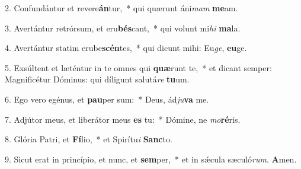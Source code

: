 2. Confundántur et revere\textbf{án}tur,~*  qui quærunt áni\textit{mam} \textbf{me}am.\

3. Avertántur retrórsum, et eru\textbf{bés}cant,~*  qui volunt mi\textit{hi} \textbf{ma}la.\

4. Avertántur statim erube\textbf{scén}tes,~*  qui dicunt mihi: Eu\textit{ge}, \textbf{eu}ge.\

5. Exsúltent et læténtur in te omnes qui \textbf{quæ}runt te,~*  et dicant semper: Magnificétur Dóminus: qui díligunt salutá\textit{re} \textbf{tu}um.\

6. Ego vero egénus, et \textbf{pau}per sum:~*  Deus, ád\textit{ju}\textbf{va} me.\

7. Adjútor meus, et liberátor meus \textbf{es} tu:~*  Dómine, ne \textit{mo}\textbf{ré}ris.\

8. Glória Patri, et \textbf{Fí}lio,~*  et Spirítu\textit{i} \textbf{Sanc}to.\

9. Sicut erat in princípio, et nunc, et \textbf{sem}per,~*  et in sǽcula sæculó\textit{rum}. \textbf{A}men.\

